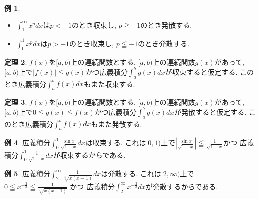 \documentclass[dvipdfmx,a4paper,11pt]{article}
\theoremstyle{definition}
\newtheorem{thm}{定理}
\newtheorem{exa}[thm]{例}
\begin{document}
 \begin{exa}
  \begin{itemize}
 \item $\int_{1}^{\infty} x^p dx$は$p<-1$のとき収束し, $p \geqq -1$のとき発散する.
 \item $\int_{0}^{1} x^p dx$は$p>-1$のとき収束し, $p \leqq -1$のとき発散する.
\end{itemize}
 \end{exa}


  \begin{tcolorbox}[
    colback = white,
    colframe = green!35!black,
    fonttitle = \bfseries,
    breakable = true]
    \begin{thm}
$f(x)$を$[a,b)$上の連続関数とする.
$[a,b)$上の連続関数$g(x)$があって, $[a , b)$上で$|f(x)| \leqq g(x)$かつ広義積分$\int_{a}^{b} g(x) dx$が収束すると仮定する.
このとき広義積分$\int_{a}^{b} f(x) dx$もまた収束する.
 \end{thm}
 \end{tcolorbox}
 
   \begin{tcolorbox}[
    colback = white,
    colframe = green!35!black,
    fonttitle = \bfseries,
    breakable = true]
    \begin{thm}
$f(x)$を$[a,b)$上の連続関数とする.
$[a,b)$上の連続関数$g(x)$があって, $[a , b)$上で$0 \leqq g(x) \leqq f(x)$かつ広義積分$\int_{a}^{b} g(x) dx$が発散すると仮定する.
このとき広義積分$\int_{a}^{b} f(x) dx$もまた発散する.
 \end{thm}
 \end{tcolorbox}
 
 \begin{exa}
広義積分$\int_{0}^{1} \frac{\sin x}{\sqrt{1-x}}dx $は収束する.
これは$[0, 1)$上で$|\frac{\sin x}{\sqrt{1-x}}| \leqq \frac{1}{\sqrt{1-x}}$かつ
広義積分$\int_{0}^1 \frac{1}{\sqrt{1-x}} dx$が収束するからである.
 \end{exa}
 
  \begin{exa}
広義積分$\int_{2}^{\infty} \frac{1}{\sqrt[3]{x(x-1)}}dx $は発散する.
これは$[2, \infty)$上で
$0 \leqq x^{-\frac{2}{3}}\leqq \frac{1}{\sqrt[3]{x(x-1)}}$
かつ
広義積分$\int_{2}^{\infty} x^{- \frac{2}{3}} dx$が発散するからである.
 \end{exa}
\end{document}
